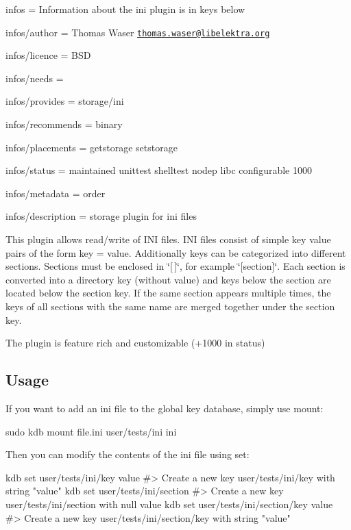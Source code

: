 
\begin{DoxyItemize}
\item infos = Information about the ini plugin is in keys below
\item infos/author = Thomas Waser \href{mailto:thomas.waser@libelektra.org}{\tt thomas.\+waser@libelektra.\+org}
\item infos/licence = B\+SD
\item infos/needs =
\item infos/provides = storage/ini
\item infos/recommends = binary
\item infos/placements = getstorage setstorage
\item infos/status = maintained unittest shelltest nodep libc configurable 1000
\item infos/metadata = order
\item infos/description = storage plugin for ini files
\end{DoxyItemize}

This plugin allows read/write of I\+NI files. I\+NI files consist of simple key value pairs of the form {\ttfamily key = value}. Additionally keys can be categorized into different sections. Sections must be enclosed in \char`\"{}\mbox{[}$\,$\mbox{]}\char`\"{}, for example \char`\"{}\mbox{[}section\mbox{]}\char`\"{}. Each section is converted into a directory key (without value) and keys below the section are located below the section key. If the same section appears multiple times, the keys of all sections with the same name are merged together under the section key.

The plugin is feature rich and customizable (+1000 in status)

\subsection*{Usage}

If you want to add an ini file to the global key database, simply use mount\+:


\begin{DoxyCode}
sudo kdb mount file.ini user/tests/ini ini
\end{DoxyCode}


Then you can modify the contents of the ini file using set\+:


\begin{DoxyCode}
kdb set user/tests/ini/key value
#> Create a new key user/tests/ini/key with string "value"
kdb set user/tests/ini/section
#> Create a new key user/tests/ini/section with null value
kdb set user/tests/ini/section/key value
#> Create a new key user/tests/ini/section/key with string "value"
\end{DoxyCode}



